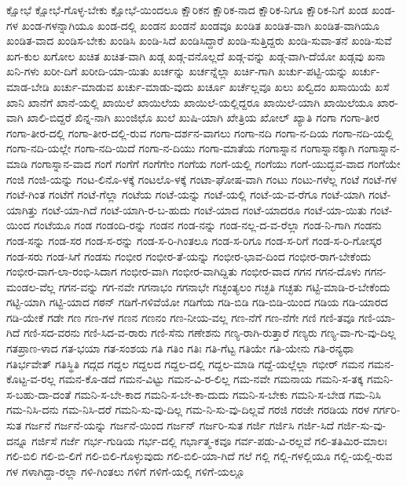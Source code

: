 {ಕ್ಷೋಭೆ
ಕ್ಷೋಭೆ-ಗೊಳ್ಳ-ಬೇಕು
ಕ್ಷೋಭೆ-ಯಿಂದಲೂ
ಕ್ಷೌರಿಕನ
ಕ್ಷೌರಿಕ-ನಾದ
ಕ್ಷೌರಿಕ-ನಿಗೂ
ಕ್ಷೌರಿಕ-ನಿಗೆ
ಖಂಡ
ಖಂಡ-ಗಳ
ಖಂಡ-ಗಳನ್ನಾಗಿಯೂ
ಖಂಡ-ದಲ್ಲಿ
ಖಂಡನ
ಖಂಡನೆ
ಖಂಡವೂ
ಖಂಡಿತ
ಖಂಡಿತ-ವಾಗಿ
ಖಂಡಿತ-ವಾಗಿಯೂ
ಖಂಡಿತ-ವಾದ
ಖಂಡಿಸ-ಬೇಕು
ಖಂಡಿಸಿ
ಖಂಡಿ-ಸಿದೆ
ಖಂಡಿಸಿದ್ದಾರೆ
ಖಂಡಿ-ಸುತ್ತಿದ್ದರು
ಖಂಡಿ-ಸುವಾ-ತನೆ
ಖಂಡಿ-ಸುವೆ
ಖಗ-ಕುಲ
ಖಗೋಲ
ಖಚಿತ
ಖಚಿತ-ವಾಗಿ
ಖಡ್ಗ
ಖಡ್ಗ-ವನೊಲ್ಲದೆ
ಖಡ್ಗ-ವನ್ನು
ಖಡ್ಗ-ವಾಗಿ-ದೆಯೋ
ಖಡ್ಗವು
ಖನಾ
ಖನಿ-ಗಳು
ಖರೀ-ದಿಗೆ
ಖರೀದಿ-ಯಾ-ಯಿತು
ಖರ್ಚನ್ನು
ಖರ್ಚನ್ನೆಲ್ಲಾ
ಖರ್ಚಿ-ಗಾಗಿ
ಖರ್ಚು-ಪಟ್ಟಿ-ಯನ್ನು
ಖರ್ಚು-ಮಾಡ-ಬೇಡಿ
ಖರ್ಚು-ಮಾಡುವ
ಖರ್ಚು-ಮಾಡು-ವುದು
ಖರ್ಚೂ
ಖರ್ಚೆಲ್ಲವೂ
ಖಲು
ಖಲ್ವಿದಂ
ಖಸಾಯಿಯೆ
ಖಸೆ
ಖಾನಿ
ಖಾನೆಗೆ
ಖಾನೆ-ಯಲ್ಲಿ
ಖಾಯಿಲೆ
ಖಾಯಿಲೆಯ
ಖಾಯಿಲೆ-ಯಲ್ಲಿದ್ದರೂ
ಖಾಯಿಲೆ-ಯಾಗಿ
ಖಾಯಿಲೆಯೂ
ಖಾರ-ವಾಗಿ
ಖಾಲಿ-ಬಿದ್ದರೆ
ಖಿನ್ನ-ನಾಗಿ
ಖುಂಜಿಛೊ
ಖುಲೆ
ಖುಷಿ-ಯಾಗಿ
ಖೇತ್ರಿಯ
ಖೋಲ್
ಖ್ಯಾತಿ
ಗಂಗಾ
ಗಂಗಾ-ತೀರ
ಗಂಗಾ-ತೀರ-ದಲ್ಲಿ
ಗಂಗಾ-ತೀರ-ದಲ್ಲಿ-ರುವ
ಗಂಗಾ-ದರ್ಶನ-ವಾಗಲು
ಗಂಗಾ-ನದಿ
ಗಂಗಾ-ನ-ದಿಯ
ಗಂಗಾ-ನದಿ-ಯಲ್ಲಿ
ಗಂಗಾ-ನದಿ-ಯಲ್ಲೇ
ಗಂಗಾ-ನದಿ-ಯಿದೆ
ಗಂಗಾ-ನ-ದಿಯು
ಗಂಗಾ-ಮಾತೆಯ
ಗಂಗಾಸ್ನಾನ
ಗಂಗಾಸ್ನಾನಕ್ಕಾಗಿ
ಗಂಗಾಸ್ನಾನ-ಮಾಡಿ
ಗಂಗಾಸ್ನಾನ-ವಾದ
ಗಂಗೆ
ಗಂಗೆಗೆ
ಗಂಗೆಗೇಂ
ಗಂಗೆಯ
ಗಂಗೆ-ಯಲ್ಲಿ
ಗಂಗೆಯು
ಗಂಗೆ-ಯುದ್ಭವ-ವಾದ
ಗಂಗೆಯೇ
ಗಂಜಿ
ಗಂಜಿ-ಯನ್ನು
ಗಂಟ-ಲಿನೊ-ಳಕ್ಕೆ
ಗಂಟಲೊ-ಳಕ್ಕೆ
ಗಂಟಾ-ಘೋಷ-ವಾಗಿ
ಗಂಟು
ಗಂಟು-ಗಳೆಲ್ಲ
ಗಂಟೆ
ಗಂಟೆ-ಗಳ
ಗಂಟೆ-ಗಿಂತ
ಗಂಟೆಗೆ
ಗಂಟೆ-ಗೆಲ್ಲಾ
ಗಂಟೆಯ
ಗಂಟೆ-ಯನ್ನು
ಗಂಟೆ-ಯಲ್ಲಿ
ಗಂಟೆ-ಯ-ವ-ರೆಗೂ
ಗಂಟೆ-ಯಾಗಿ
ಗಂಟೆ-ಯಾಗಿತ್ತು
ಗಂಟೆ-ಯಾ-ಗಿದೆ
ಗಂಟೆ-ಯಾಗಿ-ರ-ಬ-ಹುದು
ಗಂಟೆ-ಯಾದ
ಗಂಟೆ-ಯಾದರೂ
ಗಂಟೆ-ಯಾ-ಯಿತು
ಗಂಟೆ-ಯಿಂದ
ಗಂಟೆಯೂ
ಗಂಡ
ಗಂಡಂದಿ-ರನ್ನು
ಗಂಡನ
ಗಂಡ-ನನ್ನು
ಗಂಡ-ನಲ್ಲ-ದ-ವ-ರೆಲ್ಲಾ
ಗಂಡ-ನಿ-ಗಾಗಿ
ಗಂಡನು
ಗಂಡ-ಸನ್ನು
ಗಂಡ-ಸರ
ಗಂಡ-ಸ-ರನ್ನು
ಗಂಡ-ಸ-ರಿ-ಗಿಂತಲೂ
ಗಂಡ-ಸ-ರಿಗೂ
ಗಂಡ-ಸ-ರಿಗೆ
ಗಂಡ-ಸ-ರಿ-ಗೋಸ್ಕರ
ಗಂಡ-ಸರು
ಗಂಡ-ಸಿಗೆ
ಗಂಡಸು
ಗಂಭೀರ
ಗಂಭೀರ-ತೆ-ಯನ್ನು
ಗಂಭೀರ-ಭಾವ-ದಿಂದ
ಗಂಭೀರ-ರಾಗ-ಬೇಕೆಂದು
ಗಂಭೀರ-ವಾಗ-ಲಾ-ರಂಭಿ-ಸಿದಾಗ
ಗಂಭೀರ-ವಾಗಿ
ಗಂಭೀರ-ವಾಗಿದ್ದಿತು
ಗಂಭೀರ-ವಾದ
ಗಗನ
ಗಗನ-ದೊಳು
ಗಗನ-ಮಂಡಲ-ವೆಲ್ಲ
ಗಗನ-ವನ್ನು
ಗಗ-ನವೇ
ಗಗನಾಭಂ
ಗಗನಾಭೇ
ಗಚ್ಛಂತ್ಯಲಂ
ಗಚ್ಛತಿ
ಗಚ್ಛತು
ಗಟ್ಟಿ-ಮಾಡಿ-ರ-ಬೇಕೆಂದು
ಗಟ್ಟಿ-ಯಾಗಿ
ಗಟ್ಟಿ-ಯಾದ
ಗಠನ್
ಗಡಿಗೆ-ಗಳಿವೆಯೋ
ಗಡಿಗೆಯ
ಗಡಿ-ಬಿಡಿ
ಗಡಿ-ಬಿಡಿ-ಯಿಂದ
ಗಡಿಯ
ಗಡಿ-ಯಾರದ
ಗಡಿ-ಯೇಕೆ
ಗಡೇ
ಗಣ
ಗಣ-ಗಳ
ಗಣನ
ಗಣನಂ
ಗಣ-ನೀಯ-ವಲ್ಲ
ಗಣ-ನೆಗೆ
ಗಣ-ನೆಗೇ
ಗಣಿ
ಗಣಿ-ತವೂ
ಗಣಿ-ಯಾ-ಗಿದೆ
ಗಣಿ-ಸದ-ವರನು
ಗಣಿ-ಸಿದ-ವ-ರಾರು
ಗಣಿ-ಸೆನು
ಗಣೇಶನು
ಗಣ್ಯ-ರಾಗಿ-ರುತ್ತಾರೆ
ಗಣ್ಯರು
ಗಣ್ಯ-ವಾ-ಗು-ವು-ದಿಲ್ಲ
ಗತಪ್ರಾಣ-ಳಾದ
ಗತ-ಭಯಾ
ಗತ-ಸಂಶಯ
ಗತಿ
ಗತಿಂ
ಗತಿಃ
ಗತಿ-ಗೆಟ್ಟ
ಗತಿಯೇ
ಗತಿ-ಯೇನು
ಗತಿ-ರನ್ಯಥಾ
ಗತಿರ್ಭವೇತ್
ಗತಿಸ್ಥಿತಿ
ಗದ್ಗದ
ಗದ್ದಲ
ಗದ್ದಲದ
ಗದ್ದಲ-ದಲ್ಲಿ
ಗದ್ದಲ-ಮಾಡಿ
ಗದ್ದೆ-ಯಲ್ಲೆಲ್ಲಾ
ಗಭೀರ್
ಗಮನ
ಗಮನ-ಕೊಟ್ಟ-ವ-ರಲ್ಲ
ಗಮನ-ಕೊ-ಡದೆ
ಗಮನ-ವಿಟ್ಟು
ಗಮನ-ವಿ-ರ-ಲಿಲ್ಲ
ಗಮ-ನವೇ
ಗಮನಾಯ
ಗಮನಿ-ಸ-ತಕ್ಕ
ಗಮನಿ-ಸ-ಬಹು-ದಾ-ದಂತೆ
ಗಮನಿ-ಸ-ಬೇ-ಕಾದ
ಗಮನಿ-ಸ-ಬೇ-ಕಾ-ದುದು
ಗಮನಿ-ಸ-ಬೇಕು
ಗಮನಿ-ಸ-ಬೇಡ
ಗಮ-ನಿಸಿ
ಗಮ-ನಿಸಿ-ದನು
ಗಮ-ನಿಸಿ-ದರೆ
ಗಮನಿ-ಸು-ವು-ದಿಲ್ಲ
ಗಮ-ನಿ-ಸು-ವು-ದಿಲ್ಲವೆ
ಗರಜಿ
ಗರಜೇ
ಗರಡಿಯ
ಗರಳ
ಗರ್ಗರಿ-ಸುತ
ಗರ್ಜನೆ
ಗರ್ಜನೆ-ಯನ್ನು
ಗರ್ಜನೆ-ಯಿಂದ
ಗರ್ಜನ್
ಗರ್ಜರಿ-ಸುತ
ಗರ್ಜಿ
ಗರ್ಜಿಸಿ
ಗರ್ಜಿ-ಸಿದೆ
ಗರ್ಜಿ-ಸು-ವು-ದನ್ನೂ
ಗರ್ಜಿಸೆ
ಗರ್ಜೆ
ಗರ್ಭ-ಗುಡಿಯ
ಗರ್ಭ-ದಲ್ಲಿ
ಗರ್ಭಾತ್ಮ-ಕವೂ
ಗರ್ವ-ಪಡು-ವಿ-ರಲ್ಲವೆ
ಗಲಿ-ತತಿಮಿರ-ಮಾಲಃ
ಗಲಿ-ಬಿಲಿ
ಗಲಿ-ಬಿ-ಲಿಗೆ
ಗಲಿ-ಬಿಲಿ-ಗೊಳ್ಳುವುದು
ಗಲಿ-ಬಿಲಿ-ಯಾ-ಗಿದೆ
ಗಲೆ
ಗಲ್ಲಿ
ಗಲ್ಲಿ-ಗಳಲ್ಲಿಯೂ
ಗಲ್ಲಿ-ಯಲ್ಲಿ-ರುವ
ಗಳ
ಗಳಾಗಿದ್ದಾ-ರಲ್ಲಾ
ಗಳಿ-ಗಿಂತಲು
ಗಳಿಗೆ
ಗಳಿಗೆ-ಯಲ್ಲಿ
ಗಳಿಗೆ-ಯಲ್ಲೂ
}
